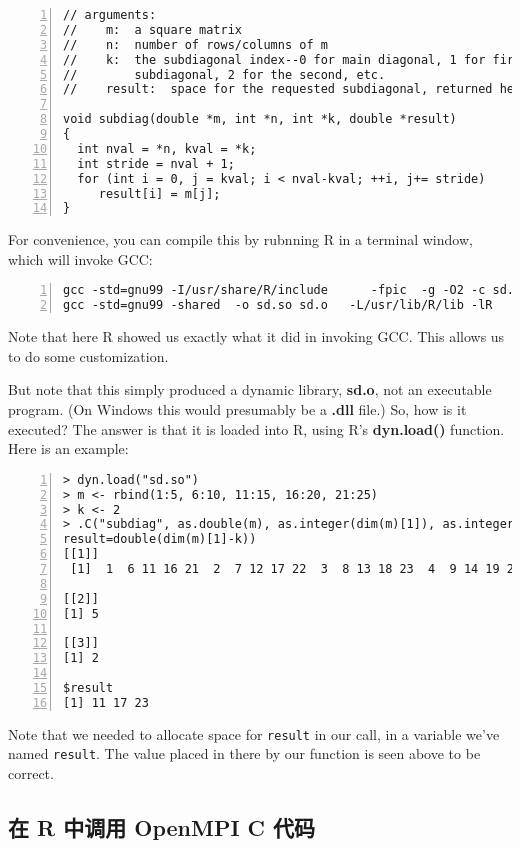 \begin{lstlisting}[numbers=left]
// arguments:
//    m:  a square matrix
//    n:  number of rows/columns of m
//    k:  the subdiagonal index--0 for main diagonal, 1 for first
//        subdiagonal, 2 for the second, etc.
//    result:  space for the requested subdiagonal, returned here

void subdiag(double *m, int *n, int *k, double *result)
{
  int nval = *n, kval = *k;
  int stride = nval + 1;
  for (int i = 0, j = kval; i < nval-kval; ++i, j+= stride)
     result[i] = m[j];
}
\end{lstlisting}

For convenience, you can compile this by rubnning R in a terminal
window, which will invoke GCC:

\begin{lstlisting}[numbers=left]
% R CMD SHLIB sd.c
gcc -std=gnu99 -I/usr/share/R/include      -fpic  -g -O2 -c sd.c -o sd.o
gcc -std=gnu99 -shared  -o sd.so sd.o   -L/usr/lib/R/lib -lR
\end{lstlisting}

Note that here R showed us exactly what it did in invoking GCC.  This
allows us to do some customization.

But note that this simply produced a dynamic library, {\bf sd.o}, not an
executable program.  (On Windows this would presumably be a {\bf .dll}
file.)  So, how is it executed?  The answer is that it is loaded into R,
using R's {\bf dyn.load()} function.  Here is an example:

\begin{lstlisting}[numbers=left]
> dyn.load("sd.so")
> m <- rbind(1:5, 6:10, 11:15, 16:20, 21:25)
> k <- 2
> .C("subdiag", as.double(m), as.integer(dim(m)[1]), as.integer(k),
result=double(dim(m)[1]-k))
[[1]]
 [1]  1  6 11 16 21  2  7 12 17 22  3  8 13 18 23  4  9 14 19 24  5 10 15 20 25

[[2]]
[1] 5

[[3]]
[1] 2

$result
[1] 11 17 23
\end{lstlisting}

Note that we needed to allocate space for {\tt result} in our call, in a
variable we've named {\tt result}.  The value placed in there by our
function is seen above to be correct.

\subsection{在 R 中调用 OpenMPI C 代码}

